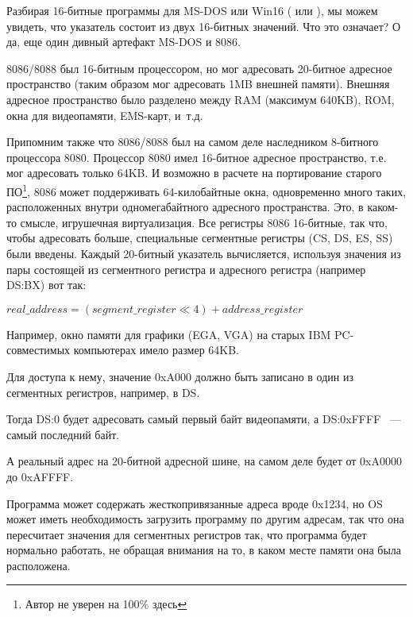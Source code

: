 \label{8086_memory_model}

Разбирая 16-битные программы для MS-DOS или Win16
( или ),
мы можем увидеть, что указатель состоит из двух 16-битных значений.
Что это означает? О да, еще один дивный артефакт MS-DOS и 8086.

8086/8088 был 16-битным процессором, но мог адресовать 20-битное адресное
пространство (таким образом мог адресовать 1MB внешней памяти).
Внешняя адресное пространство было разделено между \ac{RAM} (максимум 640KB),
\ac{ROM}, окна для видеопамяти, EMS-карт, и~т.д.

Припомним также что 8086/8088 был на самом деле наследником 8-битного процессора 8080.
Процессор 8080 имел 16-битное адресное пространство, т.е. мог адресовать только 64KB.
И возможно в расчете на портирование старого ПО\footnote{Автор не уверен на 100\% здесь},
8086 может поддерживать 64-килобайтные
окна, одновременно много таких, расположенных внутри одномегабайтного адресного пространства.
Это, в каком-то смысле, игрушечная виртуализация.
Все регистры 8086 16-битные, так что, чтобы адресовать больше, специальные сегментные
регистры (CS, DS, ES, SS) были введены.
Каждый 20-битный указатель вычисляется, используя значения из пары состоящей из сегментного регистра
и адресного регистра (например DS:BX) вот так:

\begin{center}
$real\_address = (segment\_register \ll 4) + address\_register$
\end{center}

Например, окно памяти для графики (\ac{EGA}, \ac{VGA}) на старых IBM PC-совместимых компьютерах
имело размер 64KB.

Для доступа к нему, значение 0xA000 должно быть записано в один из сегментных регистров,
например, в DS.

Тогда DS:0 будет адресовать самый первый байт видеопамяти, а DS:0xFFFF ~--- самый последний байт.

А реальный адрес на 20-битной адресной шине, на самом деле будет от 0xA0000 до 0xAFFFF.

Программа может содержать жесткопривязанные адреса вроде 0x1234, но \ac{OS} может иметь необходимость
загрузить программу по другим адресам, так что она пересчитает значения для сегментных регистров так,
что программа будет нормально работать, не обращая внимания на то,
в каком месте памяти она была расположена.

